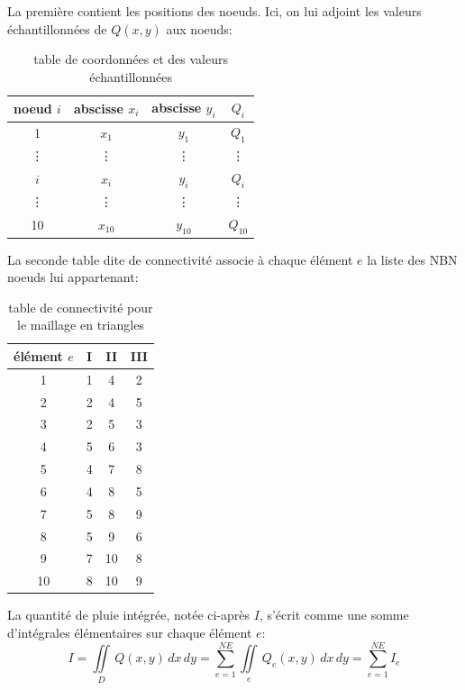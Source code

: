 \documentclass[a4paper, 10pt]{article}
\begin{document}
La première contient les positions des noeuds. Ici, on lui adjoint
 les valeurs échantillonnées de $Q(x,y)$ aux noeuds:
\begin{table}[h!] 
\centering 
\begin{tabular}{|c|c | c |c|}
  \hline
  noeud $i$ & abscisse $x_i$& abscisse $y_i$ & $Q_i$ \\
  \hline
  1 & $x_1$ & $y_1$ & $Q_1$ \\
\vdots   & \vdots   & \vdots & \vdots \\
  $i$ & $x_{i}$ & $y_{i}$ & $Q_{i}$ \\
\vdots   & \vdots   & \vdots & \vdots \\
  10 & $x_{10}$ & $y_{10}$ & $Q_{10}$ \\
  \hline
\end{tabular}
\label{tab:hresult} 
\caption{table de coordonnées et des valeurs échantillonnées} %
\end{table}

La seconde table dite de connectivité associe à chaque élément $e$ la liste des NBN noeuds
lui appartenant:

\begin{table}[h!] 
\centering 
\begin{tabular}{|c|c|c| c |}
  \hline
  élément $e$ &  I & II & III \\
  \hline
1&  1	 &4	 &2 \\
 2 & 2	 &4	 &5 \\
 3 & 2	 &5	 &3 \\
 4 & 5	 &6	 &3 \\
 5 & 4	 &7	 &8 \\
 6 & 4	 &8	 &5 \\
 7 & 5	 &8	 &9 \\
 8 & 5	 &9	 &6 \\
 9 & 7	 &10 &8 \\
 10 & 8	 &10 &9 \\
  \hline
\end{tabular}
\label{tab2:hresult} 
\caption{table de connectivité pour le maillage en triangles} %
\end{table}


La quantité de pluie intégrée, notée ci-après $I$, s'écrit comme une somme d'intégrales élémentaires sur chaque élément $e$:
\begin{equation}
I=\iint\limits_{D}\, Q(x, y)\, dx\, dy=\sum_{e=1}^{NE} \iint\limits_{e}\, Q_e(x, y)\, dx \, dy=\sum_{e=1}^{NE} I_e
\end{equation}
\end{document}
